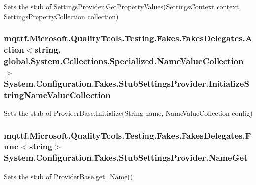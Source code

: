 Sets the stub of Settings\-Provider.\-Get\-Property\-Values(\-Settings\-Context context, Settings\-Property\-Collection collection)

\hypertarget{class_system_1_1_configuration_1_1_fakes_1_1_stub_settings_provider_af1b3df977745a6c5042759dcd3e55fe6}{
\subsubsection[{Initialize\-String\-Name\-Value\-Collection}]{\setlength{\rightskip}{0pt plus 5cm}mqttf.\-Microsoft.\-Quality\-Tools.\-Testing.\-Fakes.\-Fakes\-Delegates.\-Action$<$string, global.\-System.\-Collections.\-Specialized.\-Name\-Value\-Collection$>$ System.\-Configuration.\-Fakes.\-Stub\-Settings\-Provider.\-Initialize\-String\-Name\-Value\-Collection}}\label{class_system_1_1_configuration_1_1_fakes_1_1_stub_settings_provider_af1b3df977745a6c5042759dcd3e55fe6}


Sets the stub of Provider\-Base.\-Initialize(\-String name, Name\-Value\-Collection config)

\hypertarget{class_system_1_1_configuration_1_1_fakes_1_1_stub_settings_provider_a03738cfb6dc7ddb8963ffee22072881a}{
\subsubsection[{Name\-Get}]{\setlength{\rightskip}{0pt plus 5cm}mqttf.\-Microsoft.\-Quality\-Tools.\-Testing.\-Fakes.\-Fakes\-Delegates.\-Func$<$string$>$ System.\-Configuration.\-Fakes.\-Stub\-Settings\-Provider.\-Name\-Get}}\label{class_system_1_1_configuration_1_1_fakes_1_1_stub_settings_provider_a03738cfb6dc7ddb8963ffee22072881a}


Sets the stub of Provider\-Base.\-get\-\_\-\-Name()

